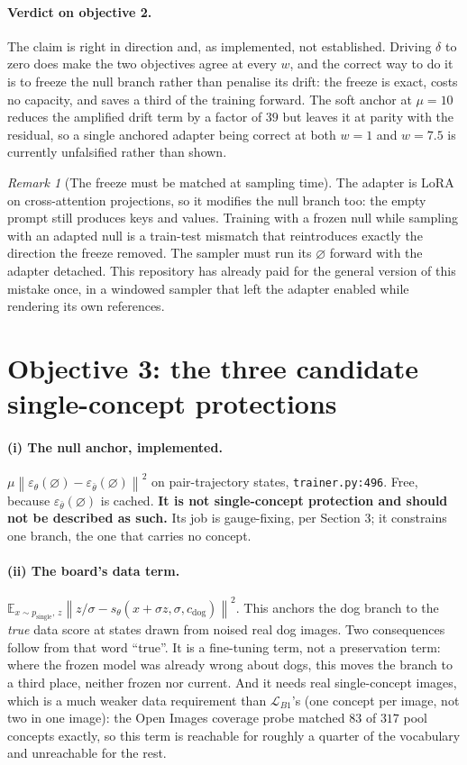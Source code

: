 \documentclass[11pt]{article}
\newcommand{\eps}{\varepsilon}
\newcommand{\epsth}{\eps_\theta}
\newcommand{\epsfr}{\eps_{\bar\theta}}
\newcommand{\E}{\mathbb{E}}
\newcommand{\norm}[1]{\left\lVert #1 \right\rVert}
\newcommand{\cnull}{\varnothing}
\theoremstyle{plain}
\theoremstyle{remark}
\newtheorem{remark}[proposition]{Remark}
\begin{document}
\paragraph{Verdict on objective 2.}
The claim is right in direction and, as implemented, not established. Driving $\delta$ to zero does
make the two objectives agree at every $w$, and the correct way to do it is to freeze the null
branch rather than penalise its drift: the freeze is exact, costs no capacity, and saves a third of
the training forward. The soft anchor at $\mu = 10$ reduces the amplified drift term by a factor of
$39$ but leaves it at parity with the residual, so a single anchored adapter being correct at both
$w = 1$ and $w = 7.5$ is currently unfalsified rather than shown.

\begin{remark}[The freeze must be matched at sampling time]
The adapter is LoRA on cross-attention projections, so it modifies the null branch too: the empty
prompt still produces keys and values. Training with a frozen null while sampling with an adapted
null is a train-test mismatch that reintroduces exactly the direction the freeze removed. The
sampler must run its $\cnull$ forward with the adapter detached. This repository has already paid
for the general version of this mistake once, in a windowed sampler that left the adapter enabled
while rendering its own references.
\end{remark}

\section{Objective 3: the three candidate single-concept protections}

\paragraph{(i) The null anchor, implemented.}
$\mu \norm{\epsth(\cnull) - \epsfr(\cnull)}^2$ on pair-trajectory states, \texttt{trainer.py:496}.
Free, because $\epsfr(\cnull)$ is cached. \textbf{It is not single-concept protection and should
not be described as such.} Its job is gauge-fixing, per Section 3; it constrains one branch, the one
that carries no concept.

\paragraph{(ii) The board's data term.}
$\E_{x \sim p_{\mathrm{single}},\,z}\norm{z/\sigma - s_\theta(x+\sigma z,\sigma,c_{\mathrm{dog}})}^2$.
This anchors the dog branch to the \emph{true} data score at states drawn from noised real dog
images. Two consequences follow from that word ``true''. It is a fine-tuning term, not a
preservation term: where the frozen model was already wrong about dogs, this moves the branch to a
third place, neither frozen nor current. And it needs real single-concept images, which is a much
weaker data requirement than $\mathcal{L}_{B1}$'s (one concept per image, not two in one image):
the Open Images coverage probe matched $83$ of $317$ pool concepts exactly, so this term is
reachable for roughly a quarter of the vocabulary and unreachable for the rest.
\end{document}
